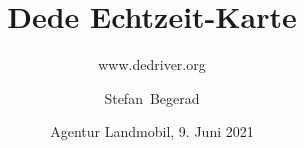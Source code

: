


\usepackage{hyperref}

\usebackgroundtemplate

\usepackage{tikz}

\title[Dede]%
{Dede Echtzeit-Karte}

\subtitle{www.dedriver.org}

\author[Begerad]%
{Stefan~Begerad}

\date[ALM, 9. Juni 21]%
{Agentur Landmobil, 9. Juni 2021}

